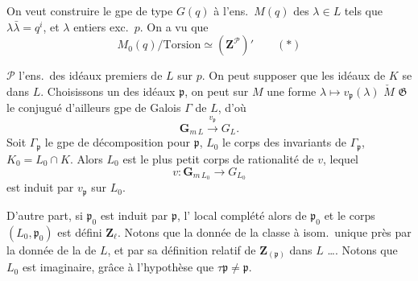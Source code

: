 \documentclass[11pt,a4paper]{article}
\begin{document}


On veut construire le gpe de type  $G(q)$
 à l'ens.\ $M(q)$ des $\lambda \in L$ tels que
$\lambda\bar{\lambda} = q^{i}$, et $\lambda$ entiers exc.\ $p$. On a vu que
\[
  M_{0}(q)/\mathrm{Torsion} \simeq (\mathbf{Z}^{\mathcal{P}})' \qquad (*)
\]

$\mathcal{P}$ l'ens.\ des idéaux premiers de $L$ sur $p$. On peut supposer
que les idéaux  de $K$ se  dans $L$.
Choisissons un des \struck{\ill{}} idéaux \ill{} $\mathfrak{p}$, on peut
 \ill{} sur $M$ une forme \ill{}
$\lambda \mapsto v_{\mathfrak{p}}(\lambda)$ \ill{} $\check{M}$ \ill{}
\ill{} $\mathfrak{G}$ le \ill{} conjugué d'ailleurs \ill{} gpe de Galois
$\Gamma$ de $L$, d'où
\[
  \mathbf{G}_{m\,L} \xrightarrow{\ v_{\mathfrak{p}}\ } G_{L}.
\]
Soit $\Gamma_{\mathfrak{p}}$ le gpe de décomposition pour $\mathfrak{p}$,
  $L_{0}$ le corps
 des invariants de $\Gamma_{\mathfrak{p}}$, $K_{0} = L_{0} \cap K$.
Alors $L_{0}$ est le plus petit corps de rationalité de $v$, 
lequel 
\[
  v : \mathbf{G}_{m\,L_{0}} \longrightarrow G_{L_{0}}
\]
est induit par $v_{\mathfrak{p}}$ sur $L_{0}$.

D'autre part, si $\mathfrak{p}_{0}$ est induit par $\mathfrak{p}$,
l'\ill{} local complété  alors
\struck{\ill{} \ill{} \ill{} \ill{}} \ill{} de $\mathfrak{p}_{0}$ et
\ill{} le corps $(L_{0}, \mathfrak{p}_{0})$ est défini \ill{}
$\mathbf{Z}_{\ell}$. Notons que \ill{} la donnée de la classe à isom.\
unique près par la donnée de la \struck{\ill{}} \ill{} de $L$, et par sa
définition \ill{} relatif de $\mathbf{Z}_{(\mathfrak{p})}$ dans $L$ ….
Notons que $L_{0}$ est \ill{} imaginaire, grâce à l'hypothèse que
$\tau\mathfrak{p} \neq \mathfrak{p}$.
\end{document}
